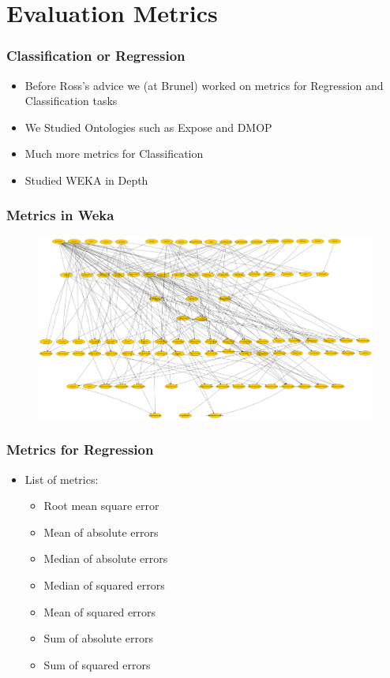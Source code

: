 \documentclass[compress]{beamer}
\begin{document}
\section{Evaluation Metrics}
\begin{frame}
\frametitle{Classification or Regression} 
\begin{itemize}%
\item Before Ross's advice we (at Brunel) worked on metrics for Regression and Classification tasks
\item We Studied Ontologies such as Expose and DMOP
\item Much more metrics for Classification
\item Studied WEKA in Depth
\end{itemize}
\end{frame}


\begin{frame}
\frametitle{Metrics in Weka} 
\begin{figure}[h!]
  \centering
    \includegraphics[width=1.05\textwidth]{weka-metrics}
\end{figure}
\end{frame}


\begin{frame}
\frametitle{Metrics for Regression} 
\begin{itemize}%
\item List of metrics:
\begin{itemize}%
\item Root mean square error
\item Mean of absolute errors
\item Median of absolute errors
\item Median of squared errors
\item Mean of squared errors
\item Sum of absolute errors
\item Sum of squared errors
\end{itemize}
\end{itemize}
\end{frame}
\end{document}
